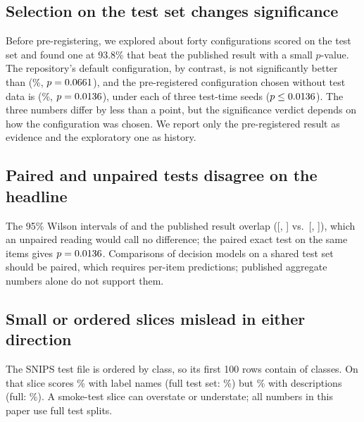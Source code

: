 \subsection{Selection on the test set changes significance}
\label{sec:find-selection}
Before pre-registering, we explored about forty configurations scored on the test set and found one at 93.8\% that %
beat the published \jev{} result with a small $p$-value.
The repository's default configuration, by contrast, is not significantly better than \jev{} (\fsDefaultAcc\%,
$p=0.0661$), and the pre-registered configuration chosen without test data is (\fsCleanAcc\%,
$p=0.0136$), under each of three test-time seeds ($p\le0.0136$). The three numbers differ by less
than a point, but the significance verdict depends on how the configuration was chosen. We report only the
pre-registered result as evidence and the exploratory one as history.

\subsection{Paired and unpaired tests disagree on the headline}
\label{sec:find-paired}
The 95\% Wilson intervals of %
 \orb{} and the published \jev{} result overlap ([\fsCleanWilsonLo, \fsCleanWilsonHi]
vs.\ [\fsJevPubWilsonLo, \fsJevPubWilsonHi]), which an unpaired reading would call no difference; the paired exact
test on the same items gives $p=0.0136$. Comparisons of decision models on a shared test set should be
paired, which requires per-item predictions; published aggregate numbers alone do not support them.

\subsection{Small or ordered slices mislead in either direction}
\label{sec:find-slices}
The SNIPS test file is ordered by class, so its first 100 rows contain \zxSmokeSnipsClasses{} of
\zxSnipsClasses{} classes. On that slice \gj{} scores \zxSmokeSnipsNameAcc\% with label names (full test set:
\zxSmokeSnipsNameFullAcc\%) but \zxSmokeSnipsDescAcc\% with descriptions (full: \zxSmokeSnipsDescFullAcc\%). A
smoke-test slice can overstate or understate; all numbers in this paper use full test splits.

